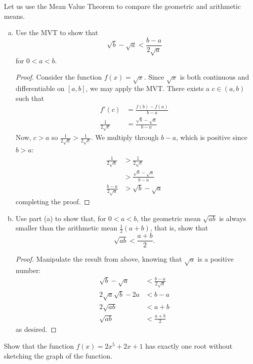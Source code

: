 \documentclass{agony}
\begin{document}
\question Let us use the Mean Value Theorem to compare the geometric and arithmetic means.
\begin{enumerate}[(a)]
  \item Use the MVT to show that \[ \sqrt{b} - \sqrt{a} < \frac{b-a}{2\sqrt{a}} \] for $0 < a < b$.
        \begin{proof}
          Consider the function $f(x) = \sqrt{x}$.
          Since $\sqrt{x}$ is both continuous and differentiable on $[a,b]$, we may apply the MVT\@.
          There exists a $c\in(a,b)$ such that \begin{align*}
            f'(c)               & = \frac{f(b)-f(a)}{b-a}         \\
            \frac{1}{2\sqrt{c}} & = \frac{\sqrt{b}-\sqrt{a}}{b-a}
          \end{align*}
          Now, $c > a$ so $\frac{1}{2\sqrt{a}} > \frac{1}{2\sqrt{c}}$.
          We multiply through $b-a$, which is positive since $b > a$:
          \begin{align*}
            \frac{1}{2\sqrt{a}}   & > \frac{1}{2\sqrt{c}}           \\
                                  & > \frac{\sqrt{b}-\sqrt{a}}{b-a} \\
            \frac{b-a}{2\sqrt{a}} & > \sqrt{b}-\sqrt{a}
          \end{align*}
          completing the proof.
        \end{proof}
  \item Use part (a) to show that, for $0 < a < b$,
        the geometric mean $\sqrt{ab}$ is always smaller than the arithmetic mean $\frac12(a+b)$,
        that is, show that \[ \sqrt{ab} < \frac{a+b}{2}. \]
        \begin{proof}
          Manipulate the result from above, knowing that $\sqrt{a}$ is a positive number:
          \begin{align*}
            \sqrt{b} - \sqrt{a}    & < \frac{b-a}{2\sqrt{a}} \\
            2\sqrt{a}\sqrt{b} - 2a & < b-a                   \\
            2\sqrt{ab}             & < a + b                 \\
            \sqrt{ab}              & < \frac{a+b}{2}
          \end{align*}
          as desired.
        \end{proof}
\end{enumerate}


\question Show that the function $f(x)=2x^5+2x+1$ has exactly one root without sketching the graph of the function.
\end{document}
